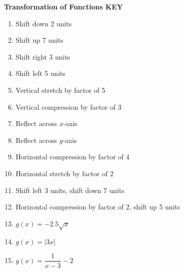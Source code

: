 \documentclass[11pt]{article}
\begin{document}


\newpage


\textbf{Transformation of Functions KEY}

\begin{enumerate}
    \item Shift down 2 units
    \item Shift up 7 units
    \item Shift right 3 units
    \item Shift left 5 units
    \item Vertical stretch by factor of 5
    \item Vertical compression by factor of 3
    \item Reflect across $x$-axis
    \item Reflect across $y$-axis
    \item Horizontal compression by factor of 4
    \item Horizontal stretch by factor of 2
    \item Shift left 3 units, shift down 7 units
    \item Horizontal compression by factor of 2, shift up 5 units
    \item $g(x) = -2.5\sqrt{x}$
    \item $g(x) = |3x|$
    \item $g(x) = \dfrac{1}{x-3} - 2$
\end{enumerate}
\end{document}
